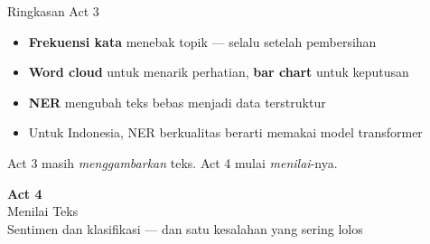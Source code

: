 \documentclass[aspectratio=169,t]{beamer}
\newcommand{\acttitle}[3]{%
  \begin{frame}[plain]
    \vspace{1.5cm}
    \begin{center}
      {\color{nvgreen}\Huge\bfseries Act #1}\\[1.2em]
      {\color{nvwhite}\Huge #2}\\[0.8em]
      {\color{nvgray}\Large #3}
    \end{center}
  \end{frame}%
}
\begin{document}
\begin{frame}{Ringkasan Act 3}
  \begin{itemize}
    \item[\textcolor{nvgreen}{\checkmark}] \textbf{Frekuensi kata} menebak topik --- selalu setelah pembersihan
    \item[\textcolor{nvgreen}{\checkmark}] \textbf{Word cloud} untuk menarik perhatian, \textbf{bar chart} untuk keputusan
    \item[\textcolor{nvgreen}{\checkmark}] \textbf{NER} mengubah teks bebas menjadi data terstruktur
    \item[\textcolor{nvgreen}{\checkmark}] Untuk Indonesia, NER berkualitas berarti memakai model transformer
  \end{itemize}
  \vspace{0.9em}
  \begin{center}
    {\color{nvlightgreen}\small Act 3 masih \emph{menggambarkan} teks. Act 4 mulai \emph{menilai}-nya.}
  \end{center}
\end{frame}

\acttitle{4}{Menilai Teks}{Sentimen dan klasifikasi --- dan satu kesalahan yang sering lolos}
\end{document}
